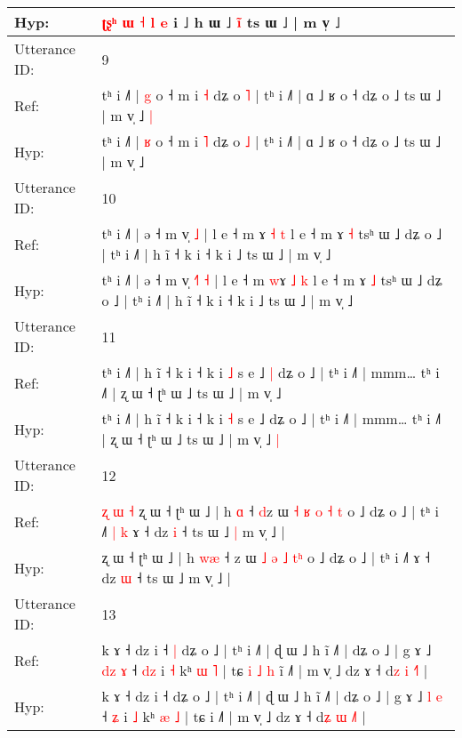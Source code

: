 \documentclass[10pt]{article}
\DeclareRobustCommand{\hl}[1]{{\textcolor{red}{#1}}}
\begin{document}
\begin{longtable}{ll}
 \\
Hyp: & \hl{}\hl{ʈ}\hl{ʂ}\hl{ʰ} \hl{}\hl{}\hl{ɯ} \hl{˧} \hl{l} \hl{e} i ˩ h ɯ ˩\hl{ }\hl{i}\hl{̃} ts ɯ ˩ | m v̩ ˩\hl{}\hl{}
 \\
\midrule
Utterance ID: & 9 \\
Ref: & tʰ i ˩˥ | \hl{g} o ˧ m i \hl{˧} dʑ o \hl{˥} | tʰ i ˩˥ | ɑ ˩ ʁ o ˧ dʑ o ˩ ts ɯ ˩ | m v̩ ˩\hl{ }\hl{|}
 \\
Hyp: & tʰ i ˩˥ | \hl{ʁ} o ˧ m i \hl{˥} dʑ o \hl{˩} | tʰ i ˩˥ | ɑ ˩ ʁ o ˧ dʑ o ˩ ts ɯ ˩ | m v̩ ˩\hl{}\hl{}
 \\
\midrule
Utterance ID: & 10 \\
Ref: & tʰ i ˩˥ | ə ˧ m v̩\hl{}\hl{}\hl{} \hl{˩} | l e ˧ m \hl{}ɤ \hl{˧} \hl{t} l e ˧ m ɤ \hl{˧} tsʰ ɯ ˩ dʑ o ˩ | tʰ i ˩˥ | h ĩ ˧ k i ˧ k i ˩ ts ɯ ˩ | m v̩ ˩
 \\
Hyp: & tʰ i ˩˥ | ə ˧ m v̩\hl{ }\hl{˧}\hl{˥} \hl{˧} | l e ˧ m \hl{w}ɤ \hl{˩} \hl{k} l e ˧ m ɤ \hl{˩} tsʰ ɯ ˩ dʑ o ˩ | tʰ i ˩˥ | h ĩ ˧ k i ˧ k i ˩ ts ɯ ˩ | m v̩ ˩
 \\
\midrule
Utterance ID: & 11 \\
Ref: & tʰ i ˩˥ | h ĩ ˧ k i ˧ k i \hl{˩} s e ˩\hl{ }\hl{|} dʑ o ˩ | tʰ i ˩˥ | mmm… tʰ i ˩˥ | ʐ ɯ ˧ ʈʰ ɯ ˩ ts ɯ ˩ | m v̩ ˩\hl{}\hl{}
 \\
Hyp: & tʰ i ˩˥ | h ĩ ˧ k i ˧ k i \hl{˧} s e ˩\hl{}\hl{} dʑ o ˩ | tʰ i ˩˥ | mmm… tʰ i ˩˥ | ʐ ɯ ˧ ʈʰ ɯ ˩ ts ɯ ˩ | m v̩ ˩\hl{ }\hl{|}
 \\
\midrule
Utterance ID: & 12 \\
Ref: & \hl{ʐ}\hl{ }\hl{ɯ}\hl{ }\hl{˧}\hl{ }ʐ ɯ ˧ ʈʰ ɯ ˩ | h \hl{}\hl{ɑ} ˧ \hl{d}z ɯ \hl{˧} \hl{ʁ} \hl{o} \hl{˧}\hl{ }\hl{t} o ˩ dʑ o ˩ | tʰ i ˩˥\hl{ }\hl{|}\hl{ }\hl{k} ɤ ˧ dz \hl{i} ˧ ts ɯ ˩\hl{ }\hl{|} m v̩ ˩ |
 \\
Hyp: & \hl{}\hl{}\hl{}\hl{}\hl{}\hl{}ʐ ɯ ˧ ʈʰ ɯ ˩ | h \hl{w}\hl{æ} ˧ \hl{}z ɯ \hl{˩} \hl{ə} \hl{˩} \hl{}\hl{t}\hl{ʰ} o ˩ dʑ o ˩ | tʰ i ˩˥\hl{}\hl{}\hl{}\hl{} ɤ ˧ dz \hl{ɯ} ˧ ts ɯ ˩\hl{}\hl{} m v̩ ˩ |
 \\
\midrule
Utterance ID: & 13 \\
Ref: & k ɤ ˧ dz i ˧\hl{ }\hl{|} dʑ o ˩ | tʰ i ˩˥ | ɖ ɯ ˩ h ĩ ˩˥ | dʑ o ˩ | g ɤ ˩ \hl{d}\hl{z} \hl{ɤ} ˧ \hl{d}\hl{z} i \hl{˧} kʰ \hl{ɯ} \hl{˥} | tɕ\hl{ }\hl{i}\hl{ }\hl{˩}\hl{ }\hl{h} i\hl{̃} ˩˥ | m v̩ ˩ dz ɤ ˧ d\hl{z} \hl{i} \hl{˧}˥ |
 \\
Hyp: & k ɤ ˧ dz i ˧\hl{}\hl{} dʑ o ˩ | tʰ i ˩˥ | ɖ ɯ ˩ h ĩ ˩˥ | dʑ o ˩ | g ɤ ˩ \hl{}\hl{l} \hl{e} ˧ \hl{}\hl{ʑ} i \hl{˩} kʰ \hl{æ} \hl{˩} | tɕ\hl{}\hl{}\hl{}\hl{}\hl{}\hl{} i\hl{} ˩˥ | m v̩ ˩ dz ɤ ˧ d\hl{ʑ} \hl{ɯ} \hl{˩}˥ |

\end{longtable}
\end{document}
